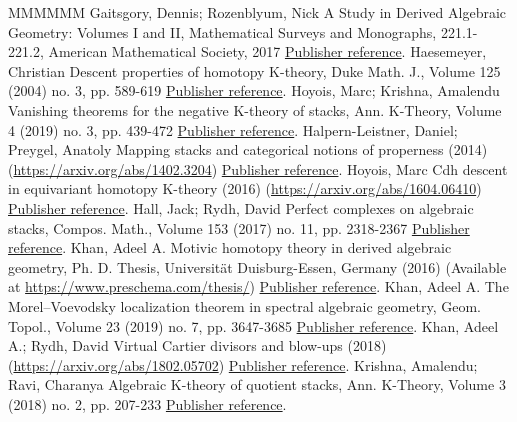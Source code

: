 \documentclass[11pt]{article}
\theoremstyle{definition}
\numberwithin{equation}{section}
\numberwithin{figure}{section}
\numberwithin{table}{section}
\begin{document}
\begin{thebibliography}{MMMMMM}
 Gaitsgory, Dennis; Rozenblyum, Nick A Study in Derived Algebraic Geometry: Volumes I and II, Mathematical Surveys and Monographs, 221.1-221.2, American Mathematical Society, 2017 \href{https://ahl.centre-mersenne.org/item/AHL_2020__3__1091_0/#GaitsgoryRozenblyum}{Publisher reference}.
 Haesemeyer, Christian Descent properties of homotopy K-theory, Duke Math. J., Volume 125 (2004) no. 3, pp. 589-619 \href{https://ahl.centre-mersenne.org/item/AHL_2020__3__1091_0/#Haesemeyer}{Publisher reference}.
 Hoyois, Marc; Krishna, Amalendu Vanishing theorems for the negative K-theory of stacks, Ann. K-Theory, Volume 4 (2019) no. 3, pp. 439-472 \href{https://ahl.centre-mersenne.org/item/AHL_2020__3__1091_0/#HoyoisKrishna}{Publisher reference}.
 Halpern-Leistner, Daniel; Preygel, Anatoly Mapping stacks and categorical notions of properness (2014) (\url{https://arxiv.org/abs/1402.3204}) \href{https://ahl.centre-mersenne.org/item/AHL_2020__3__1091_0/#HalpernLeistnerPreygel}{Publisher reference}.
 Hoyois, Marc Cdh descent in equivariant homotopy K-theory (2016) (\url{https://arxiv.org/abs/1604.06410}) \href{https://ahl.centre-mersenne.org/item/AHL_2020__3__1091_0/#HoyoisCdh}{Publisher reference}.
 Hall, Jack; Rydh, David Perfect complexes on algebraic stacks, Compos. Math., Volume 153 (2017) no. 11, pp. 2318-2367 \href{https://ahl.centre-mersenne.org/item/AHL_2020__3__1091_0/#HallRydhPerfect}{Publisher reference}.
 Khan, Adeel A. Motivic homotopy theory in derived algebraic geometry, Ph. D. Thesis, Universität Duisburg-Essen, Germany (2016) (Available at \url{https://www.preschema.com/thesis/}) \href{https://ahl.centre-mersenne.org/item/AHL_2020__3__1091_0/#KhanThesis}{Publisher reference}.
 Khan, Adeel A. The Morel–Voevodsky localization theorem in spectral algebraic geometry, Geom. Topol., Volume 23 (2019) no. 7, pp. 3647-3685 \href{https://ahl.centre-mersenne.org/item/AHL_2020__3__1091_0/#KhanLocalization}{Publisher reference}.
 Khan, Adeel A.; Rydh, David Virtual Cartier divisors and blow-ups (2018) (\url{https://arxiv.org/abs/1802.05702}) \href{https://ahl.centre-mersenne.org/item/AHL_2020__3__1091_0/#KhanBlowup}{Publisher reference}.
 Krishna, Amalendu; Ravi, Charanya Algebraic K-theory of quotient stacks, Ann. K-Theory, Volume 3 (2018) no. 2, pp. 207-233 \href{https://ahl.centre-mersenne.org/item/AHL_2020__3__1091_0/#KrishnaRavi}{Publisher reference}.

\end{thebibliography}
\end{document}
